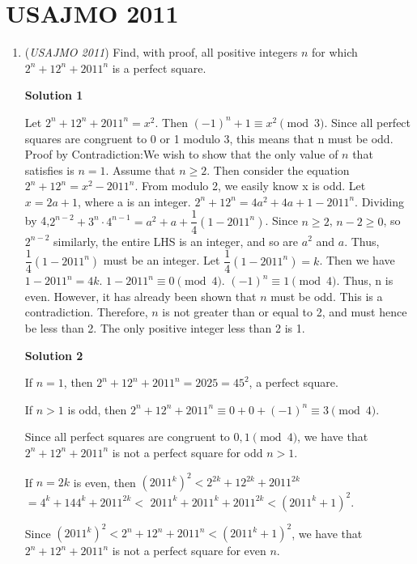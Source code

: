 \section{USAJMO 2011}
        \begin{enumerate}
        	\item (\textit{USAJMO 2011}) Find, with proof, all positive integers $n$ for which $2^n + 12^n + 2011^n$ is a perfect square.


 



\textbf{Solution 1}

Let $2^n + 12^n + 2011^n = x^2$. Then $(-1)^n + 1 \equiv x^2 \pmod {3}$. Since all perfect squares are congruent to 0 or 1 modulo 3, this means that n must be odd. Proof by Contradiction:We wish to show that the only value of $n$ that satisfies is $n = 1$. Assume that $n \ge 2$. Then consider the equation$2^n + 12^n = x^2 - 2011^n$. From modulo 2, we easily know x is odd. Let $x = 2a + 1$, where a is an integer. $2^n + 12^n = 4a^2 + 4a + 1 - 2011^n$. Dividing by 4,$2^{n-2} + 3^n \cdot 4^{n-1} = a^2 + a + \dfrac {1}{4} (1 - 2011^n)$. Since $n \ge 2$, $n-2 \ge 0$, so $2^{n-2}$ similarly, the entire LHS is an integer, and so are $a^2$ and $a$. Thus, $\dfrac {1}{4} (1 - 2011^n)$ must be an integer. Let $\dfrac {1}{4} (1 - 2011^n) = k$. Then we have $1- 2011^n = 4k$. $1- 2011^n \equiv 0 \pmod {4}$. $(-1)^n \equiv 1 \pmod {4}$. Thus, n is even. However, it has already been shown that $n$ must be odd.  This is a contradiction.  Therefore, $n$ is not greater than or equal to 2, and must hence be less than 2.  The only positive integer less than 2 is 1.

 



\textbf{Solution 2}

If $n = 1$, then $2^n + 12^n + 2011^n = 2025 = 45^2$, a perfect square. 

 If $n > 1$ is odd, then $2^n + 12^n + 2011^n \equiv 0 + 0 + (-1)^n \equiv 3 \pmod{4}$. 

 Since all perfect squares are congruent to $0,1 \pmod{4}$, we have that $2^n+12^n+2011^n$ is not a perfect square for odd $n > 1$. 

 If $n = 2k$ is even, then $(2011^k)^2 < 2^{2k}+12^{2k}+2011^{2k}$ $= 4^k + 144^k + 2011^{2k} <$ $2011^k + 2011^k + 2011^{2k} < (2011^k+1)^2$. 

 Since $(2011^k)^2 < 2^n+12^n+2011^n < (2011^k+1)^2$, we have that $2^n+12^n+2011^n$ is not a perfect square for even $n$. 


\end{enumerate}
